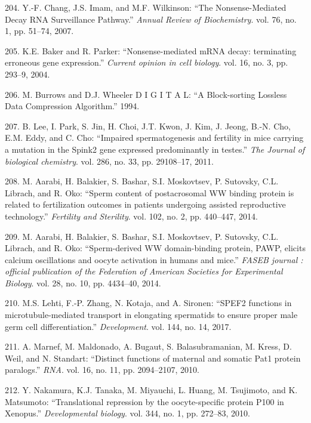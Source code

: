 \documentclass[12pt,a4paper,twoside]{ugathesis}
\theoremstyle{definition}
\theoremstyle{definition}
\theoremstyle{definition}
\theoremstyle{remark}
\begin{document}
\hypertarget{ref-Chang2007}{}
204. Y.-F. Chang, J.S. Imam, and M.F. Wilkinson: ``The Nonsense-Mediated
Decay RNA Surveillance Pathway.'' \emph{Annual Review of Biochemistry}.
vol. 76, no. 1, pp. 51--74, 2007.

\hypertarget{ref-Baker2004}{}
205. K.E. Baker and R. Parker: ``Nonsense-mediated mRNA decay:
terminating erroneous gene expression.'' \emph{Current opinion in cell
biology}. vol. 16, no. 3, pp. 293--9, 2004.

\hypertarget{ref-Burrows1994}{}
206. M. Burrows and D.J. Wheeler D I G I T A L: ``A Block-sorting
Lossless Data Compression Algorithm.'' 1994.

\hypertarget{ref-Lee2011}{}
207. B. Lee, I. Park, S. Jin, H. Choi, J.T. Kwon, J. Kim, J. Jeong,
B.-N. Cho, E.M. Eddy, and C. Cho: ``Impaired spermatogenesis and
fertility in mice carrying a mutation in the Spink2 gene expressed
predominantly in testes.'' \emph{The Journal of biological chemistry}.
vol. 286, no. 33, pp. 29108--17, 2011.

\hypertarget{ref-Aarabi2014}{}
208. M. Aarabi, H. Balakier, S. Bashar, S.I. Moskovtsev, P. Sutovsky,
C.L. Librach, and R. Oko: ``Sperm content of postacrosomal WW binding
protein is related to fertilization outcomes in patients undergoing
assisted reproductive technology.'' \emph{Fertility and Sterility}. vol.
102, no. 2, pp. 440--447, 2014.

\hypertarget{ref-Aarabi2014a}{}
209. M. Aarabi, H. Balakier, S. Bashar, S.I. Moskovtsev, P. Sutovsky,
C.L. Librach, and R. Oko: ``Sperm-derived WW domain-binding protein,
PAWP, elicits calcium oscillations and oocyte activation in humans and
mice.'' \emph{FASEB journal : official publication of the Federation of
American Societies for Experimental Biology}. vol. 28, no. 10, pp.
4434--40, 2014.

\hypertarget{ref-Lehti2017}{}
210. M.S. Lehti, F.-P. Zhang, N. Kotaja, and A. Sironen: ``SPEF2
functions in microtubule-mediated transport in elongating spermatids to
ensure proper male germ cell differentiation.'' \emph{Development}. vol.
144, no. 14, 2017.

\hypertarget{ref-Marnef2010}{}
211. A. Marnef, M. Maldonado, A. Bugaut, S. Balasubramanian, M. Kress,
D. Weil, and N. Standart: ``Distinct functions of maternal and somatic
Pat1 protein paralogs.'' \emph{RNA}. vol. 16, no. 11, pp. 2094--2107,
2010.

\hypertarget{ref-Nakamura2010}{}
212. Y. Nakamura, K.J. Tanaka, M. Miyauchi, L. Huang, M. Tsujimoto, and
K. Matsumoto: ``Translational repression by the oocyte-specific protein
P100 in Xenopus.'' \emph{Developmental biology}. vol. 344, no. 1, pp.
272--83, 2010.
\end{document}
